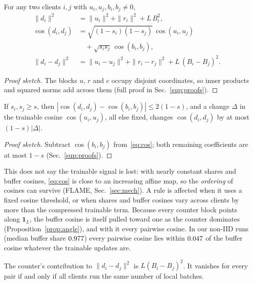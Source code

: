\documentclass[journal]{IEEEtran}
\begin{document}
\begin{proposition}
\label{prop:decomp}
For any two clients $i,j$ with $u_i,u_j,b_i,b_j\neq 0$,
\begin{align}
\|d_i\|^2 &= \|u_i\|^2+\|r_i\|^2+L\,B_i^2, \label{eq:norm}\\
\cos(d_i,d_j) &= \sqrt{(1-s_i)(1-s_j)}\,\cos(u_i,u_j)\nonumber\\
&\quad+\sqrt{s_is_j}\,\cos(b_i,b_j), \label{eq:cos}\\
\|d_i-d_j\|^2 &= \|u_i-u_j\|^2+\|r_i-r_j\|^2+L\,(B_i-B_j)^2. \label{eq:dist}
\end{align}
\end{proposition}

\begin{proof}[Proof sketch]
The blocks $u$, $r$ and $c$ occupy disjoint coordinates, so inner products and
squared norms add across them (full proof in Sec.~\ref{sup:proofs}).
\end{proof}

\begin{corollary}
\label{cor:band}
If $s_i,s_j\ge s$, then $|\cos(d_i,d_j)-\cos(b_i,b_j)|\le 2(1-s)$, and a change
$\Delta$ in the trainable cosine $\cos(u_i,u_j)$, all else fixed, changes
$\cos(d_i,d_j)$ by at most $(1-s)|\Delta|$.
\end{corollary}
\begin{proof}[Proof sketch]
Subtract $\cos(b_i,b_j)$ from~\eqref{eq:cos}; both remaining coefficients are at
most $1-s$ (Sec.~\ref{sup:proofs}).
\end{proof}

This does not say the trainable signal is lost: with nearly constant shares and
buffer cosines, \eqref{eq:cos} is close to an increasing affine map, so the
\emph{ordering} of cosines can survive (FLAME, Sec.~\ref{sec:mech}). A rule is
affected when it uses a fixed cosine threshold, or when shares and buffer cosines
vary across clients by more than the compressed trainable term. Because every counter
block points along $\mathbf{1}_L$, the buffer cosine is itself pulled toward one as the
counter dominates (Proposition~\ref{prop:angle}), and with it every pairwise cosine. In our non-IID runs (median buffer share $0.977$) every
pairwise cosine lies within $0.047$ of the buffer cosine whatever the
trainable updates are.

\begin{corollary}
\label{cor:dist}
The counter's contribution to $\|d_i-d_j\|^2$ is $L(B_i-B_j)^2$. It vanishes for
every pair if and only if all clients run the same number of local batches.
\end{corollary}
\end{document}
